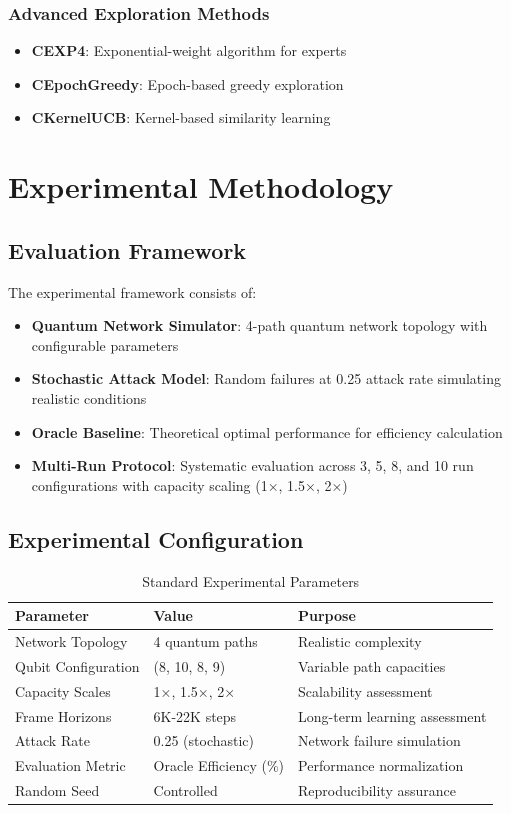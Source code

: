 \documentclass[12pt,a4paper]{article}
\begin{document}
\subsubsection{Advanced Exploration Methods}
\begin{itemize}
\item \textbf{CEXP4}: Exponential-weight algorithm for experts
\item \textbf{CEpochGreedy}: Epoch-based greedy exploration
\item \textbf{CKernelUCB}: Kernel-based similarity learning
\end{itemize}

\section{Experimental Methodology}

\subsection{Evaluation Framework}

The experimental framework consists of:

\begin{itemize}
\item \textbf{Quantum Network Simulator}: 4-path quantum network topology with configurable parameters
\item \textbf{Stochastic Attack Model}: Random failures at 0.25 attack rate simulating realistic conditions
\item \textbf{Oracle Baseline}: Theoretical optimal performance for efficiency calculation
\item \textbf{Multi-Run Protocol}: Systematic evaluation across 3, 5, 8, and 10 run configurations with capacity scaling (1×, 1.5×, 2×)
\end{itemize}

\subsection{Experimental Configuration}

\begin{table}[H]
\centering
\caption{Standard Experimental Parameters}
\begin{tabular}{@{}lll@{}}
\toprule
\textbf{Parameter} & \textbf{Value} & \textbf{Purpose} \\
\midrule
Network Topology & 4 quantum paths & Realistic complexity \\
Qubit Configuration & (8, 10, 8, 9) & Variable path capacities \\
Capacity Scales & 1×, 1.5×, 2× & Scalability assessment \\
Frame Horizons & 6K-22K steps & Long-term learning assessment \\
Attack Rate & 0.25 (stochastic) & Network failure simulation \\
Evaluation Metric & Oracle Efficiency (\%) & Performance normalization \\
Random Seed & Controlled & Reproducibility assurance \\
\bottomrule
\end{tabular}
\end{table}
\end{document}
